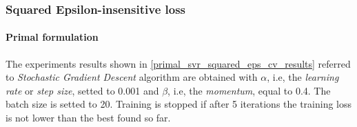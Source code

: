 \subsubsection{Squared Epsilon-insensitive loss}

\paragraph{Primal formulation}

The experiments results shown in \ref{primal_svr_squared_eps_cv_results} referred to \emph{Stochastic Gradient Descent} algorithm are obtained with $\alpha$, i.e, the \emph{learning rate} or \emph{step size}, setted to 0.001 and $\beta$, i.e, the \emph{momentum}, equal to 0.4. The batch size is setted to 20. Training is stopped if after 5 iterations the training loss is not lower than the best found so far.

